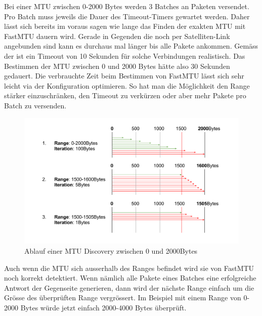 Bei einer MTU zwischen 0-2000 Bytes werden 3 Batches an Paketen versendet. Pro Batch muss jeweils die Dauer des Timeout-Timers gewartet werden. Daher lässt sich bereits im voraus sagen wie lange das Finden der exakten \acs{MTU} mit FastMTU dauern wird. Gerade in Gegenden die noch per Satelliten-Link angebunden sind kann es durchaus mal länger bis alle Pakete ankommen. Gemäss der \osag ist ein Timeout von 10 Sekunden für solche Verbindungen realistisch. Das Bestimmen der \acs{MTU} zwischen 0 und 2000 Bytes hätte also 30 Sekunden gedauert.
Die verbrauchte Zeit beim Bestimmen von FastMTU lässt sich sehr leicht via der Konfiguration optimieren. So hat man die Möglichkeit den Range stärker einzuschränken, den Timeout zu verkürzen oder aber mehr Pakete pro Batch zu versenden.

\begin{figure}[ht]
    \begin{center}
        \includegraphics[clip,width=\textwidth]{mainpart/implementation/img/FastMTUAlgorithm}
    \end{center}
    \caption{Ablauf einer MTU Discovery zwischen 0 und 2000Bytes}
\end{figure}

Auch wenn die \acs{MTU} sich ausserhalb des Ranges befindet wird sie von FastMTU noch korrekt detektiert. Wenn nämlich alle Pakete eines Batches eine erfolgreiche Antwort der Gegenseite generieren, dann wird der nächste Range einfach um die Grösse des überprüften Range vergrössert. Im Beispiel mit einem Range von 0-2000 Bytes würde jetzt einfach 2000-4000 Bytes überprüft.